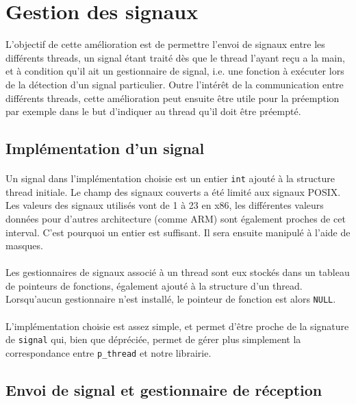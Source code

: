 \newpage
\section{Gestion des signaux}

L'objectif de cette amélioration est de permettre l'envoi de signaux entre les différents threads, un signal étant traité dès que le thread l'ayant reçu a la main, et à condition qu'il ait un gestionnaire de signal, i.e. une fonction à exécuter lors de la détection d'un signal particulier. Outre l'intérêt de la communication entre différents threads, cette amélioration peut ensuite être utile pour la préemption par exemple dans le but d'indiquer au thread qu'il doit être préempté.

\subsection{Implémentation d'un signal}

\paragraph{}
Un signal dans l'implémentation choisie est un entier \texttt{int} ajouté à la structure thread initiale. Le champ des signaux couverts a été limité aux signaux POSIX. Les valeurs des signaux utilisés vont de 1 à 23 en x86, les différentes valeurs données pour d'autres architecture (comme ARM) sont également proches de cet interval. C'est pourquoi un entier est suffisant. Il sera ensuite manipulé à l'aide de masques. 

\paragraph{}
Les gestionnaires de signaux associé à un thread sont eux stockés dans un tableau de pointeurs de fonctions, également ajouté à la structure d'un thread.
Lorsqu'aucun gestionnaire n'est installé, le pointeur de fonction est alors \texttt{NULL}.

\paragraph{}
L'implémentation choisie est assez simple, et permet d'être proche de la signature de \texttt{signal} qui, bien que dépréciée, permet de gérer plus simplement la correspondance entre \texttt{p\_thread} et notre librairie.

\subsection{Envoi de signal et gestionnaire de réception}

